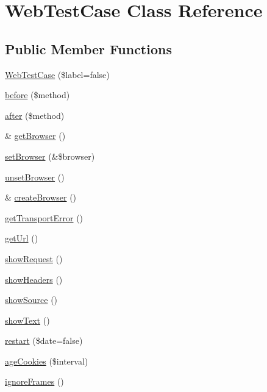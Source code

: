 \hypertarget{class_web_test_case}{
\section{WebTestCase Class Reference}
\label{class_web_test_case}
}
\subsection*{Public Member Functions}
\begin{DoxyCompactItemize}
\item 
\hyperlink{class_web_test_case_af4f14d8dd0bc743ea15308261b859f50}{WebTestCase} (\$label=false)
\item 
\hyperlink{class_web_test_case_a87f5e5088a08ea1b2588c3fcfdb2ead3}{before} (\$method)
\item 
\hyperlink{class_web_test_case_ab29c41a37c83f0a4a230f81dcee4dcbf}{after} (\$method)
\item 
\& \hyperlink{class_web_test_case_ad7ef0640edd1ef69ee201cb661ed5935}{getBrowser} ()
\item 
\hyperlink{class_web_test_case_a6a7359c09fc9665e5d34c2c69068134f}{setBrowser} (\&\$browser)
\item 
\hyperlink{class_web_test_case_a7ed6a5b76724d578d6f66a15945651ab}{unsetBrowser} ()
\item 
\& \hyperlink{class_web_test_case_a004842238df312f4fd8d10da0631bbfd}{createBrowser} ()
\item 
\hyperlink{class_web_test_case_ac12566754888b2e6e3cee8290c2df04d}{getTransportError} ()
\item 
\hyperlink{class_web_test_case_aff8c47b2f6380af648711b8fbf82667e}{getUrl} ()
\item 
\hyperlink{class_web_test_case_ade23ffdc160a37580518c0afc3657aa2}{showRequest} ()
\item 
\hyperlink{class_web_test_case_a9cb4dfc25c77a145504e46b8eb3acd5d}{showHeaders} ()
\item 
\hyperlink{class_web_test_case_a01442fb03a6a4e700e0eb22c79aaec98}{showSource} ()
\item 
\hyperlink{class_web_test_case_a7060ba1f005664015384f1280fb8c9a3}{showText} ()
\item 
\hyperlink{class_web_test_case_a7c3811b06a5a25b08baabe63599ac6e6}{restart} (\$date=false)
\item 
\hyperlink{class_web_test_case_a1f28c1af59fd3c2c4c9a2d837c089f7a}{ageCookies} (\$interval)
\item 
\hyperlink{class_web_test_case_a3fb48ba6173cf132a26a3695f2e43df3}{ignoreFrames} ()

\end{DoxyCompactItemize}
